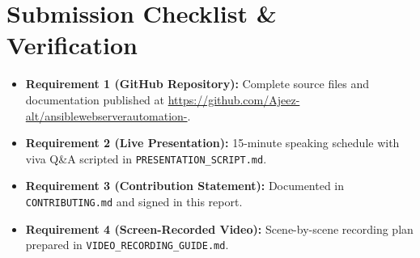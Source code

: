 \documentclass[11pt,a4paper]{article}
\begin{document}
\section{Submission Checklist \& Verification}
\begin{itemize}
    \item[$\checkmark$] \textbf{Requirement 1 (GitHub Repository):} Complete source files and documentation published at \url{https://github.com/Ajeez-alt/ansiblewebserverautomation-}.
    \item[$\checkmark$] \textbf{Requirement 2 (Live Presentation):} 15-minute speaking schedule with viva Q\&A scripted in \texttt{PRESENTATION\_SCRIPT.md}.
    \item[$\checkmark$] \textbf{Requirement 3 (Contribution Statement):} Documented in \texttt{CONTRIBUTING.md} and signed in this report.
    \item[$\checkmark$] \textbf{Requirement 4 (Screen-Recorded Video):} Scene-by-scene recording plan prepared in \texttt{VIDEO\_RECORDING\_GUIDE.md}.
\end{itemize}
\end{document}
